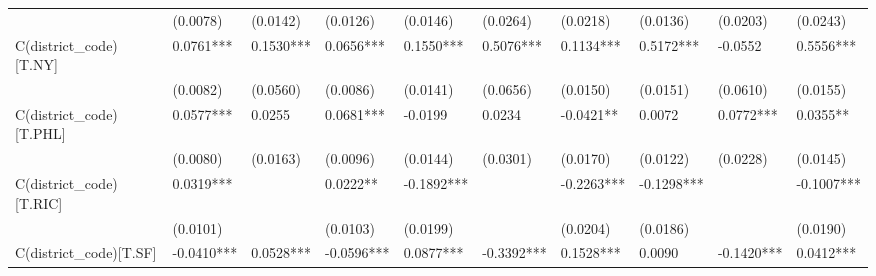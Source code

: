 \begin{table}
\begin{center}
\begin{tabular}{llllllllll}
                         & (0.0078)               & (0.0142)                & (0.0126)                 & (0.0146)                    & (0.0264)                     & (0.0218)                      & (0.0136)                   & (0.0203)                    & (0.0243)                      \\
C(district\_code)[T.NY]  & 0.0761***              & 0.1530***               & 0.0656***                & 0.1550***                   & 0.5076***                    & 0.1134***                     & 0.5172***                  & -0.0552                     & 0.5556***                     \\
                         & (0.0082)               & (0.0560)                & (0.0086)                 & (0.0141)                    & (0.0656)                     & (0.0150)                      & (0.0151)                   & (0.0610)                    & (0.0155)                      \\
C(district\_code)[T.PHL] & 0.0577***              & 0.0255                  & 0.0681***                & -0.0199                     & 0.0234                       & -0.0421**                     & 0.0072                     & 0.0772***                   & 0.0355**                      \\
                         & (0.0080)               & (0.0163)                & (0.0096)                 & (0.0144)                    & (0.0301)                     & (0.0170)                      & (0.0122)                   & (0.0228)                    & (0.0145)                      \\
C(district\_code)[T.RIC] & 0.0319***              &                         & 0.0222**                 & -0.1892***                  &                              & -0.2263***                    & -0.1298***                 &                             & -0.1007***                    \\
                         & (0.0101)               &                         & (0.0103)                 & (0.0199)                    &                              & (0.0204)                      & (0.0186)                   &                             & (0.0190)                      \\
C(district\_code)[T.SF]  & -0.0410***             & 0.0528***               & -0.0596***               & 0.0877***                   & -0.3392***                   & 0.1528***                     & 0.0090                     & -0.1420***                  & 0.0412***                     \\

\end{tabular}
\end{center}
\end{table}
